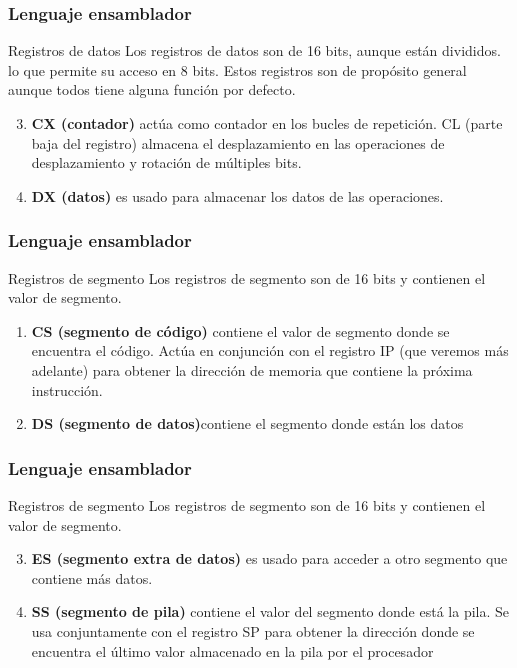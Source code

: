 \documentclass{beamer}
\begin{document}
\begin{frame}
	\frametitle{Lenguaje ensamblador}
	\begin{block}{Registros de datos} \justify
			Los registros de datos son de 16 bits, aunque están divididos. lo que permite su acceso en 8 bits. Estos registros son de propósito general aunque todos tiene alguna función por defecto. 
			\begin{enumerate}\setcounter{enumi}{2}
				\item \textbf{CX (contador)} actúa como contador en los bucles de repetición. CL (parte baja del registro) almacena el desplazamiento en las operaciones de desplazamiento y rotación de múltiples bits. 
				\item \textbf{DX (datos)} es usado para almacenar los datos de las operaciones. 
			\end{enumerate}
	\end{block}		 		
\end{frame}

\begin{frame}
	\frametitle{Lenguaje ensamblador}
	\begin{block}{Registros de segmento} \justify
		Los registros de segmento son de 16 bits y contienen el valor de segmento. 
		\begin{enumerate}
			\item \textbf{CS (segmento de código)} contiene el valor de segmento donde se encuentra el código. Actúa en conjunción con el registro IP (que veremos más adelante) para obtener la dirección de memoria que contiene la próxima instrucción.
			\item \textbf{DS (segmento de datos)}contiene el segmento donde están los datos
		\end{enumerate}
	\end{block}		 		
\end{frame}

\begin{frame}
	\frametitle{Lenguaje ensamblador}
	\begin{block}{Registros de segmento} \justify
		Los registros de segmento son de 16 bits y contienen el valor de
segmento. 
		\begin{enumerate}\setcounter{enumi}{2}
			\item \textbf{ES (segmento extra de datos)} es usado para acceder a otro segmento que contiene más datos. 
			\item \textbf{SS (segmento de pila)} contiene el valor del segmento donde está la pila. Se usa conjuntamente con el registro SP para obtener la dirección donde se encuentra el último valor almacenado en la pila por el procesador
		\end{enumerate}
	\end{block}		 		
\end{frame}
\end{document}
